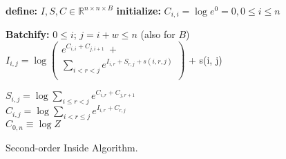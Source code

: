 \documentclass{letter}
\date{\today}
\begin{document}
\begin{algorithm}[tb]
\begin{algorithmic}[1]
\newlength{\commentindent}
\setlength{\commentindent}{.2\textwidth}
\renewcommand{\algorithmiccomment}[1]{\unskip\hfill\makebox[\commentindent][l]{$\rhd$~#1}\par}
\LetLtxMacro{\oldalgorithmic}{\algorithmic}
\renewcommand{\algorithmic}[1][0]{%
  \oldalgorithmic[#1]%
  \renewcommand{\ALC@com}[1]{%
  \ifnum\pdfstrcmp{##1}{default}=0\else\algorithmiccomment{##1}\fi}%
}
\begin{footnotesize}
\STATE \textbf{define:} $I,S,C \in \mathbb{R}^{n \times n \times B}$ 
\STATE \textbf{initialize:} $C_{i, i} = \log e^0 = 0, 0 \le i \le n$

  \STATE \textbf{Batchify:} $0 \le i$; $j=i+w \le n$ (also for $B$)
  \STATE
    $I_{i, j} = \log\left(
      \begin{array}{l}
        e^{C_{i, i}  +  C_{j, i+1}} ~ + \\
      \sum\limits_{i < r < j} e^{I_{i, r} + S_{r, j}
      + s(i, r, j)} \\

      \end{array}
      \right)$ + s(i, j)


  \STATE $S_{i, j} = \log \sum\limits_{i \le r < j} e^{C_{i, r}  +  C_{j, r+1}} $ \\
  \STATE $C_{i, j} = \log
    \sum\limits_{i < r \le j} e^{I_{i, r}  +  C_{r, j}}  $ \\
\ENDFOR
\RETURN $C_{0, n} \equiv \log Z$
\end{footnotesize}
\end{algorithmic}
\caption{Second-order Inside Algorithm.}
\label{alg:eisner-2o}
\end{algorithm}
\end{document}
